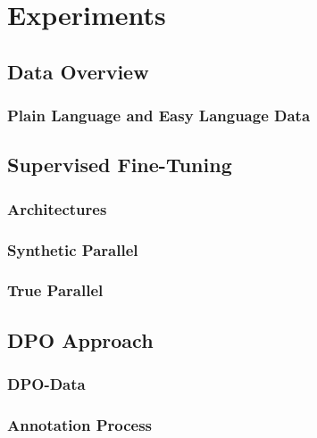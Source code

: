 \chapter{Experiments}\label{ch:exp}


\section{Data Overview}\label{sec:data_ov}

\subsection{Plain Language and Easy Language Data}\label{subsec:plain-language-and-easy-language-data}


\section{Supervised Fine-Tuning}\label{sec:supervised-fine-tuning-exp}

\subsection{Architectures}\label{subsec:architectures}

\subsection{Synthetic Parallel}\label{subsec:synthetic-parallel}


\subsection{True Parallel}\label{subsec:true-parallel}



\section{DPO Approach}\label{sec:dpo-approach}

\subsection{DPO-Data}\label{subsec:dpo-data}

\subsection{Annotation Process}\label{subsec:annotation-process}

